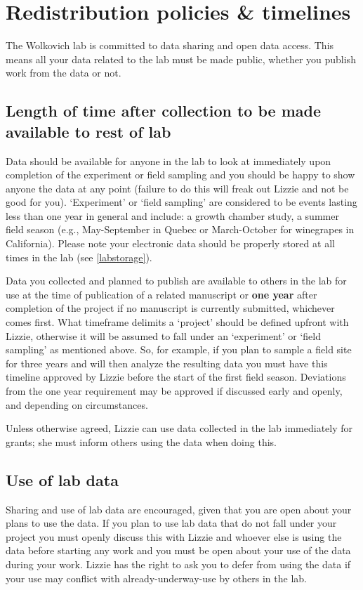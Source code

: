 \documentclass[11pt,a4paper,oneside]{article}
\begin{document}
\section{Redistribution policies \& timelines}
\label{redistrib}
The Wolkovich lab is committed to data sharing and open data access. This means all your data related to the lab must be made public, whether you publish work from the data or not. 

\subsection{Length of time after collection to be made available to rest of lab}
Data should be available for anyone in the lab to look at immediately upon completion of the experiment or field sampling and you should be happy to show anyone the data at any point (failure to do this will freak out Lizzie and not be good for you). `Experiment' or `field sampling' are considered to be events lasting less than one year in general and include: a growth chamber study, a summer field season (e.g., May-September in Quebec or March-October for winegrapes in California). Please note your electronic data should be properly stored at all times in the lab (see \ref{labstorage}).
	
Data you collected and planned to publish are available to others in the lab for use at the time of publication of a related manuscript or  {\bf one year} after completion of the project if no manuscript is currently submitted, whichever comes first. What timeframe delimits a `project' should be defined upfront with Lizzie, otherwise it will be assumed to fall under an `experiment' or `field sampling' as mentioned above. So, for example, if you plan to sample a field site for three years and will then analyze the resulting data you must have this timeline approved by Lizzie before the start of the first field season. Deviations from the one year requirement may be approved if discussed early and openly, and depending on circumstances.

Unless otherwise agreed, Lizzie can use data collected in the lab immediately for grants; she must inform others using the data when doing this. 

\subsection{Use of lab data}
Sharing and use of lab data are encouraged, given that you are open about your plans to use the data. If you plan to use lab data that do not fall under your project you must openly discuss this with Lizzie and whoever else is using the data before starting any work and you must be open about your use of the data during your work. Lizzie has the right to ask you to defer from using the data if your use may conflict with already-underway-use by others in the lab.
\end{document}
